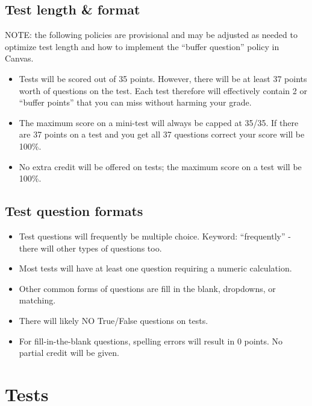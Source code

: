 \documentclass[
]{book}
\providecommand{\tightlist}{%
  \setlength{\itemsep}{0pt}\setlength{\parskip}{0pt}}
\begin{document}
\hypertarget{test-length-format}{%
\section{Test length \& format}\label{test-length-format}}

NOTE: the following policies are provisional and may be adjusted as needed to optimize test length and how to implement the ``buffer question'' policy in Canvas.

\begin{itemize}
\tightlist
\item
  Tests will be scored out of 35 points. However, there will be at least 37 points worth of questions on the test. Each test therefore will effectively contain 2 or ``buffer points'' that you can miss without harming your grade.
\item
  The maximum score on a mini-test will always be capped at 35/35. If there are 37 points on a test and you get all 37 questions correct your score will be 100\%.
\item
  No extra credit will be offered on tests; the maximum score on a test will be 100\%.
\end{itemize}

\hypertarget{test-question-formats}{%
\section{Test question formats}\label{test-question-formats}}

\begin{itemize}
\tightlist
\item
  Test questions will frequently be multiple choice. Keyword: ``frequently'' - there will other types of questions too.
\item
  Most tests will have at least one question requiring a numeric calculation.\\
\item
  Other common forms of questions are fill in the blank, dropdowns, or matching.
\item
  There will likely NO True/False questions on tests.
\item
  For fill-in-the-blank questions, spelling errors will result in 0 points. No partial credit will be given.
\end{itemize}

\hypertarget{tests}{%
\chapter{Tests}\label{tests}}
\end{document}
